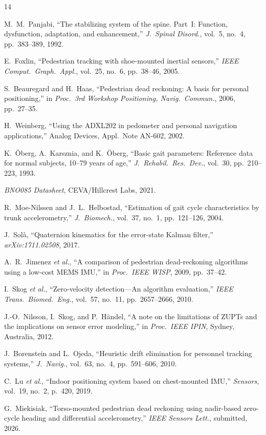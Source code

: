 \documentclass[11pt,a4paper]{article}
\begin{document}
\begin{thebibliography}{14}

M.~M.~Panjabi, ``The stabilizing system of the spine. Part~I: Function,
dysfunction, adaptation, and enhancement,'' \textit{J.\ Spinal Disord.},
vol.~5, no.~4, pp.~383--389, 1992.

E.~Foxlin, ``Pedestrian tracking with shoe-mounted inertial sensors,''
\textit{IEEE Comput.\ Graph.\ Appl.}, vol.~25, no.~6, pp.~38--46, 2005.

S.~Beauregard and H.~Haas, ``Pedestrian dead reckoning: A basis for personal
positioning,'' in \textit{Proc.\ 3rd Workshop Positioning, Navig.\ Commun.},
2006, pp.~27--35.

H.~Weinberg, ``Using the ADXL202 in pedometer and personal navigation
applications,'' Analog Devices, Appl.\ Note AN-602, 2002.

K.~\"{O}berg, A.~Karsznia, and K.~\"{O}berg, ``Basic gait parameters:
Reference data for normal subjects, 10--79 years of age,'' \textit{J.\
Rehabil.\ Res.\ Dev.}, vol.~30, pp.~210--223, 1993.

\textit{BNO085 Datasheet}, CEVA/Hillcrest Labs, 2021.

R.~Moe-Nilssen and J.~L.~Helbostad, ``Estimation of gait cycle
characteristics by trunk accelerometry,'' \textit{J.\ Biomech.}, vol.~37,
no.~1, pp.~121--126, 2004.

J.~Sol\`{a}, ``Quaternion kinematics for the error-state Kalman filter,''
\textit{arXiv:1711.02508}, 2017.

A.~R.~Jimenez \textit{et al.}, ``A comparison of pedestrian dead-reckoning
algorithms using a low-cost MEMS IMU,'' in \textit{Proc.\ IEEE WISP}, 2009,
pp.~37--42.

I.~Skog \textit{et al.}, ``Zero-velocity detection---An algorithm evaluation,''
\textit{IEEE Trans.\ Biomed.\ Eng.}, vol.~57, no.~11, pp.~2657--2666, 2010.

J.-O.~Nilsson, I.~Skog, and P.~H\"{a}ndel, ``A note on the limitations of
ZUPTs and the implications on sensor error modeling,'' in \textit{Proc.\ IEEE
IPIN}, Sydney, Australia, 2012.

J.~Borenstein and L.~Ojeda, ``Heuristic drift elimination for personnel
tracking systems,'' \textit{J.\ Navig.}, vol.~63, no.~4, pp.~591--606, 2010.

C.~Lu \textit{et al.}, ``Indoor positioning system based on chest-mounted
IMU,'' \textit{Sensors}, vol.~19, no.~2, p.~420, 2019.

G.~Miekisiak, ``Torso-mounted pedestrian dead reckoning using nadir-based
zero-cycle heading and differential accelerometry,'' \textit{IEEE Sensors
Lett.}, submitted, 2026.

\end{thebibliography}
\end{document}
